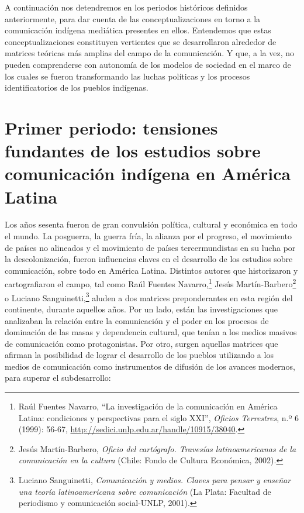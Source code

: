 \documentclass{tufte-handout}
\begin{document}
A continuación nos detendremos en los periodos históricos definidos
anteriormente, para dar cuenta de las conceptualizaciones en torno a la
comunicación indígena mediática presentes en ellos. Entendemos que estas
conceptualizaciones constituyen vertientes que se desarrollaron
alrededor de matrices teóricas más amplias del campo de la comunicación.
Y que, a la vez, no pueden comprenderse con autonomía de los modelos de
sociedad en el marco de los cuales se fueron transformando las luchas
políticas y los procesos identificatorios de los pueblos indígenas.

\hypertarget{primer-periodo-tensiones-fundantes-de-los-estudios-sobre-comunicacin-indgena-en-amrica-latina}{%
\section{Primer periodo: tensiones fundantes de los estudios sobre\\\noindent
comunicación indígena en América
Latina}\label{primer-periodo-tensiones-fundantes-de-los-estudios-sobre-comunicacin-indgena-en-amrica-latina}}

Los años sesenta fueron de gran convulsión política, cultural y
económica en todo el mundo. La posguerra, la guerra fría, la alianza por
el progreso, el movimiento de países no alineados y el movimiento de
países tercermundistas en su lucha por la descolonización, fueron
influencias claves en el desarrollo de los estudios sobre comunicación,
sobre todo en América Latina. Distintos autores que historizaron y
cartografiaron el campo, tal como Raúl Fuentes Navarro,\footnote{Raúl
  Fuentes Navarro, ``La investigación de la comunicación en América
  Latina: condiciones y perspectivas para el siglo XXI'', \emph{Oficios
  Terrestres}, n.º 6 (1999): 56-67,
  \url{http://sedici.unlp.edu.ar/handle/10915/38040}.} Jesús
Martín-Barbero\footnote{Jesús Martín-Barbero, \emph{Oficio del
  cartógrafo. Travesías latinoamericanas de la comunicación en la
  cultura} (Chile: Fondo de Cultura Económica, 2002).} o Luciano
Sanguinetti,\footnote{Luciano Sanguinetti, \emph{Comunicación y medios.
  Claves para pensar y enseñar una teoría latinoamericana sobre
  comunicación} (La Plata: Facultad de periodismo y comunicación
  social-UNLP, 2001).} aluden a dos matrices preponderantes en esta
región del continente, durante aquellos años. Por un lado, están las
investigaciones que analizaban la relación entre la comunicación y el
poder en los procesos de dominación de las masas y dependencia cultural,
que tenían a los medios masivos de comunicación como protagonistas. Por
otro, surgen aquellas matrices que afirman la posibilidad de lograr el
desarrollo de los pueblos utilizando a los medios de comunicación como
instrumentos de difusión de los avances modernos, para superar el
subdesarrollo:
\end{document}

